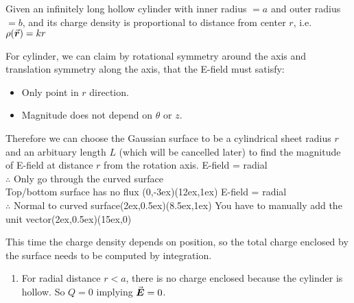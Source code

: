 \documentclass[class=article, crop=false, 12pt]{standalone}
\begin{document}
\begin{example}
    Given an infinitely long hollow cylinder with inner radius $=a$ and outer radius $=b$,
    and its charge density is proportional to distance from center $r$, i.e. $\rho(\va*{r}) =kr$
    
    For cylinder, we can claim by rotational symmetry around the axis and translation symmetry along the axis,
    that the E-field must satisfy:
    \begin{itemize}
        \item Only point in $r$ direction.
        \item Magnitude does not depend on $\theta$ or $z$.
    \end{itemize}


    Therefore we can choose the Gaussian surface to be a cylindrical sheet radius $r$ 
    and an arbituary length $L$ (which will be cancelled later)
    to find the magnitude of E-field at distance $r$ from the rotation axis.
    {\scriptsize E-field = radial \\[-1ex]\scriptsize $\therefore$ Only go through the curved surface \\[-1ex]\scriptsize Top/bottom surface has no flux}
    {(0,-3ex)}{(12ex,1ex)}
    {\scriptsize E-field = radial \\[-1ex]\scriptsize $\therefore$ Normal to curved surface}{(2ex,0.5ex)}{(8.5ex,1ex)}
    {\scriptsize You have to manually add the unit vector}{(2ex,0.5ex)}{(15ex,0)}


    This time the charge density depends on position,
    so the total charge enclosed by the surface needs to be computed by integration.

    \begin{enumerate}
        \item For radial distance $r<a$, there is no charge enclosed because the cylinder is hollow.
        So $Q=0$ implying $\va*{E}=0$.


\end{enumerate}
\end{example}
\end{document}
